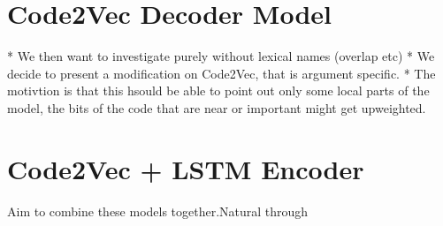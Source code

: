 
\section{Code2Vec Decoder Model} %
\label{sec:code2vec_decoder_model}

* We then want to investigate purely without lexical names (overlap etc)
* We decide to present a modification on Code2Vec, that is argument specific.
* The motivtion is that this hsould be able to point out only some local parts of the model, the bits of the code that are near or important might get upweighted.



\section{Code2Vec + LSTM Encoder} %
\label{sub:code2vec_sequence_to_sequence}

Aim to combine these models together.Natural through 

